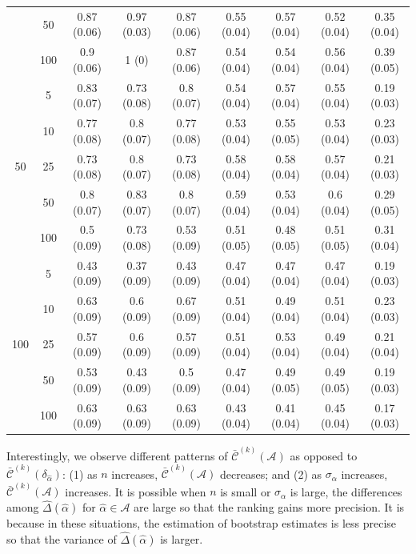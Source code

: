 \documentclass[11pt]{article}
\def\mc#1{\mathcal{#1}} %
\theoremstyle{definition}
\begin{document}
\begin{table}[t]
\begin{center}
\begin{tabular}{cc|ccc|cccc}
    & 50  & 0.87 (0.06) & 0.97 (0.03) & 0.87 (0.06) & 0.55 (0.04) & 0.57 (0.04) & 0.52 (0.04) & 0.35 (0.04) \\ 
    & 100  & 0.9 (0.06) & 1 (0) & 0.87 (0.06) & 0.54 (0.04) & 0.54 (0.04) & 0.56 (0.04) & 0.39 (0.05) \\[.3cm] 
    \multirow{5}{*}{50} & 5  & 0.83 (0.07) & 0.73 (0.08) & 0.8 (0.07) & 0.54 (0.04) & 0.57 (0.04) & 0.55 (0.04) & 0.19 (0.03) \\ 
    & 10  & 0.77 (0.08) & 0.8 (0.07) & 0.77 (0.08) & 0.53 (0.04) & 0.55 (0.05) & 0.53 (0.04) & 0.23 (0.03) \\ 
    & 25  & 0.73 (0.08) & 0.8 (0.07) & 0.73 (0.08) & 0.58 (0.04) & 0.58 (0.04) & 0.57 (0.04) & 0.21 (0.03) \\ 
    & 50  & 0.8 (0.07) & 0.83 (0.07) & 0.8 (0.07) & 0.59 (0.04) & 0.53 (0.04) & 0.6 (0.04) & 0.29 (0.05) \\ 
    & 100  & 0.5 (0.09) & 0.73 (0.08) & 0.53 (0.09) & 0.51 (0.05) & 0.48 (0.05) & 0.51 (0.05) & 0.31 (0.04) \\[.3cm] 
    \multirow{5}{*}{100} & 5  & 0.43 (0.09) & 0.37 (0.09) & 0.43 (0.09) & 0.47 (0.04) & 0.47 (0.04) & 0.47 (0.04) & 0.19 (0.03) \\ 
    & 10  & 0.63 (0.09) & 0.6 (0.09) & 0.67 (0.09) & 0.51 (0.04) & 0.49 (0.04) & 0.51 (0.04) & 0.23 (0.03) \\ 
    & 25  & 0.57 (0.09) & 0.6 (0.09) & 0.57 (0.09) & 0.51 (0.04) & 0.53 (0.04) & 0.49 (0.04) & 0.21 (0.04) \\ 
    & 50  & 0.53 (0.09) & 0.43 (0.09) & 0.5 (0.09) & 0.47 (0.04) & 0.49 (0.05) & 0.49 (0.05) & 0.19 (0.03) \\ 
    & 100  & 0.63 (0.09) & 0.63 (0.09) & 0.63 (0.09) & 0.43 (0.04) & 0.41 (0.04) & 0.45 (0.04) & 0.17 (0.03) \\ 
\end{tabular}
  \end{center}  
   \vspace{-.5cm}
\end{table}


Interestingly, we observe different patterns of $\bar{\mc{C}}^{(k)}(\mc{A})$ as opposed to $\bar{\mc{C}}^{(k)}(\delta_{\hat{\alpha}})$: (1) as $n$ increases, $\bar{\mc{C}}^{(k)}(\mc{A})$ decreases; and (2) as $\sigma_{\alpha}$ increases, $\bar{\mc{C}}^{(k)}(\mc{A})$ increases. It is possible  when $n$ is small or $\sigma_{\alpha}$ is large, the differences among $\hat{\Delta}(\hat{\alpha})$ for  $\hat{\alpha}\in \mc{A}$ are large so that the ranking gains more precision. It is because in these situations, the estimation of bootstrap estimates is less precise so that the variance of $\hat{\Delta}(\hat{\alpha})$ is larger.
\end{document}
